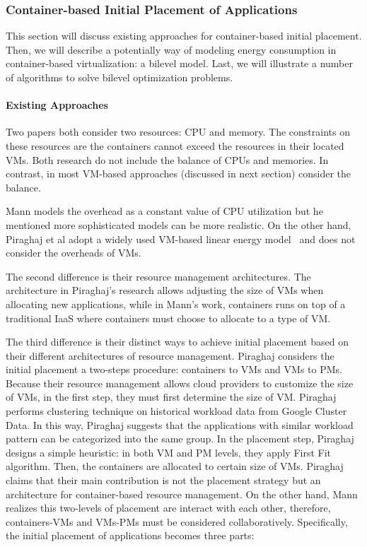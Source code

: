 \subsubsection{Container-based Initial Placement of Applications}
\label{container-based-placement}
This section will discuss existing approaches for container-based initial placement. Then, we will describe a potentially way of modeling energy consumption in container-based virtualization: a bilevel model. Last, we will illustrate a number of algorithms to solve bilevel optimization problems. 


\paragraph{Existing Approaches}

 Two papers both consider two resources: CPU and memory. The constraints on these resources are the containers cannot exceed the resources in their located VMs. Both research do not include the balance of CPUs and memories. In contrast, in most VM-based approaches (discussed in next section) consider the balance.

 Mann models the overhead as a constant value of CPU utilization but he mentioned more sophisticated models can be more realistic. On the other hand, Piraghaj et al \cite{Piraghaj:2016bw} adopt a widely used VM-based linear energy model~\cite{Xavier:2017jl} and does not consider the overheads of VMs. 

The second difference is their resource management architectures. The architecture in Piraghaj's research allows adjusting 
the size of VMs when allocating new applications, while in Mann's work, containers runs on top of a traditional IaaS where containers must choose to allocate to a type of VM. 

The third difference is their distinct ways to achieve initial placement based on their different architectures of resource management. Piraghaj considers the initial placement a two-steps procedure: containers to VMs and VMs to PMs. Because their resource management allows cloud providers to customize the size of VMs, in the first step, they must first determine the size of VM. Piraghaj performs clustering technique on historical workload data from Google Cluster Data. In this way, Piraghaj suggests that the applications with similar workload pattern can be categorized into the same group. In the placement step, Piraghaj designs a simple heuristic: in both VM and PM levels, they apply First Fit algorithm. Then, the containers are allocated to certain size of VMs. Piraghaj claims that their main contribution is not the placement strategy but an architecture for container-based resource management. On the other hand, Mann realizes this two-levels of placement are interact with each other, therefore, containers-VMs and VMs-PMs must be considered collaboratively. Specifically, the initial placement of applications becomes three parts: 

